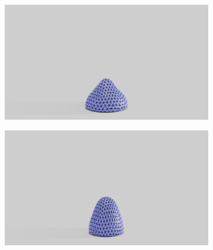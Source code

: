 \begin{figure}
\begin{subfigure}{.16\linewidth}
		\label{sfig:ball-vc-4}
	\end{subfigure}%
	\begin{subfigure}{.16\linewidth}
		\centering
		{\includegraphics[width=2.0\textwidth]{images/coarse_ball/vp/0400.jpg}}
		\label{sfig:ball-vc-5}
	\end{subfigure}%
	\begin{subfigure}{.16\linewidth}
		\centering
		{\includegraphics[width=2.0\textwidth]{images/coarse_ball/vp/0450.jpg}}
		\label{sfig:ball-vc-6}
	\end{subfigure}\hfill
	\begin{subfigure}{.03\linewidth}
	\end{subfigure}%
	\begin{subfigure}{.16\linewidth}
	\end{subfigure}%
	\begin{subfigure}{.16\linewidth}

\end{subfigure}
\end{figure}
